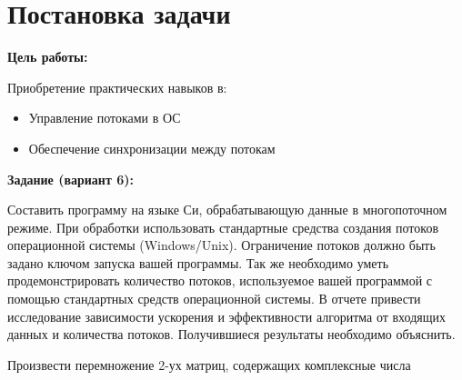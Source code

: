 \section{Постановка задачи}

{\bfseries Цель работы:} 

Приобретение практических навыков в:

\begin{itemize}
    \item Управление потоками в ОС
    \item Обеспечение синхронизации между потокам
\end{itemize}

{\bfseries Задание (вариант 6):} 

Составить программу на языке Си, обрабатывающую данные в многопоточном режиме. При обработки использовать стандартные средства создания потоков операционной системы (Windows/Unix). Ограничение потоков должно быть задано ключом
запуска вашей программы. Так же необходимо уметь продемонстрировать количество потоков, используемое вашей программой с помощью стандартных средств операционной системы. В отчете привести исследование зависимости ускорения и эффективности алгоритма от входящих данных и количества потоков. Получившиеся результаты необходимо объяснить.

Произвести перемножение 2-ух матриц, содержащих комплексные числа

\pagebreak
